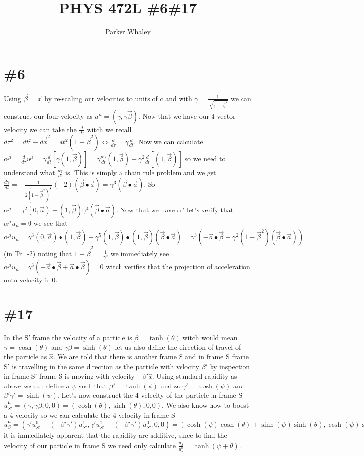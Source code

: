\documentclass[10pt,a4paper]{article}
\author{Parker Whaley}
\title{PHYS 472L \#6\#17}
\begin{document}
\maketitle

\section{\#6}
Using \(\vec{\beta}=\vec{x}\) by re-scaling our velocities to units of c and with \(\gamma=\frac{1}{\sqrt[]{1-\vec{\beta}^2}}\) we can construct our four velocity as \(u^\mu=(\gamma,\gamma\vec{\beta})\).  Now that we have our 4-vector velocity we can take the \(\frac{d}{d\tau}\) witch we recall \(d\tau^2=dt^2-\vec{dx}^2=dt^2(1-\vec{\beta}^2)\Longleftrightarrow\frac{d}{d\tau}=\gamma\frac{d}{dt}\).  Now we can calculate \(\alpha^\mu=\frac{d}{d\tau}u^\mu=\gamma\frac{d}{dt}[\gamma(1,\vec{\beta})]=\gamma\frac{d\gamma}{dt}(1,\vec{\beta})+\gamma^2\frac{d}{dt}[(1,\vec{\beta})]\) so we need to understand what \(\frac{d\gamma}{dt}\) is.  This is simply a chain rule problem and we get \(\frac{d\gamma}{dt}=-\frac{1}{2(1-\vec{\beta}^2)^\frac{3}{2}}(-2)(\vec{\beta}\bullet\vec{a})=\gamma^3(\vec{\beta}\bullet\vec{a})\).  So \(\alpha^\mu=\gamma^2(0,\vec{a})+(1,\vec{\beta})\gamma^4(\vec{\beta}\bullet\vec{a})\).  Now that we have \(\alpha^\mu\) let's verify that \(\alpha^\mu u_\mu=0\) we see that \(\alpha^\mu u_\mu=\gamma^3 (0,\vec{a})\bullet(1,\vec{\beta})+\gamma^5 (1,\vec{\beta})\bullet(1,\vec{\beta})(\vec{\beta}\bullet\vec{a})=\gamma^3(-\vec{a}\bullet\vec{\beta}+\gamma^2(1-\vec{\beta}^2)(\vec{\beta}\bullet\vec{a}))\) (in Tr=-2) noting that \(1-\vec{\beta}^2=\frac{1}{\gamma^2}\) we immediately see \(\alpha^\mu u_\mu=\gamma^3(-\vec{a}\bullet\vec{\beta}+\vec{a}\bullet\vec{\beta})=0\) witch verifies that the projection of acceleration onto velocity is 0.

\section{\#17}
In the S' frame the velocity of a particle is \(\beta=\tanh(\theta)\) witch would mean \(\gamma=\cosh(\theta)\) and \(\gamma\beta=\sinh(\theta)\) let us also define the direction of travel of the particle as \(\hat{x}\).  We are told that there is another frame S and in frame S frame S' is travelling in the same direction as the particle with velocity \(\beta'\) by inspection in frame S' frame S is moving with velocity \(-\beta'\hat{x}\).  Using standard rapidity as above we can define a \(\psi\) such that \(\beta'=\tanh(\psi)\) and so \(\gamma'=\cosh(\psi)\) and \(\beta'\gamma'=\sinh(\psi)\).  Let's now construct the 4-velocity of the particle in frame S' \(u^{\mu}_{S'}=(\gamma,\gamma\beta,0,0)=(\cosh(\theta),\sinh(\theta),0,0)\).  We also know how to boost a 4-velocity so we can calculate the 4-velocity in frame S \(u^{\mu}_{S}=(\gamma'u^{0}_{S'}-(-\beta'\gamma')u^{1}_{S'},\gamma'u^{1}_{S'}-(-\beta'\gamma')u^{0}_{S'},0,0)=(\cosh(\psi)\cosh(\theta)+\sinh(\psi)\sinh(\theta),\cosh(\psi)\sinh(\theta)+\sinh(\psi)\cosh(\theta),0,0)=(\cosh(\psi+\theta),\sinh(\psi+\theta),0,0)\) it is immediately apparent that the rapidity are additive, since to find the velocity of our particle in frame S we need only calculate \(\frac{u^{1}_{S}}{u^{0}_{S}}=\tanh(\psi+\theta)\).
\end{document}
